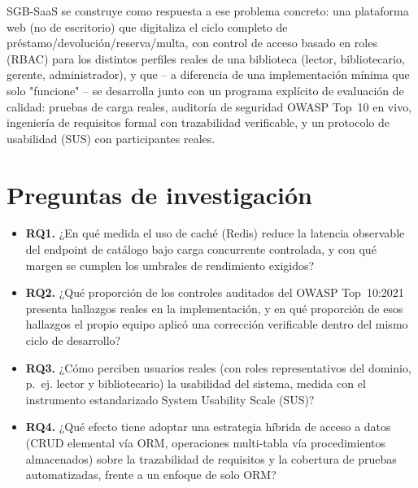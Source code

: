 SGB-SaaS se construye como respuesta a ese problema concreto: una
plataforma web (no de escritorio) que digitaliza el ciclo completo de
préstamo/devolución/reserva/multa, con control de acceso basado en
roles (RBAC) para los distintos perfiles reales de una biblioteca
(lector, bibliotecario, gerente, administrador), y que -- a diferencia
de una implementación mínima que solo "funcione" -- se desarrolla junto
con un programa explícito de evaluación de calidad: pruebas de carga
reales, auditoría de seguridad OWASP Top~10 en vivo, ingeniería de
requisitos formal con trazabilidad verificable, y un protocolo de
usabilidad (SUS) con participantes reales.

\section{Preguntas de investigación}
\label{sec:rqs}


\begin{itemize}[leftmargin=1.2cm]
  \item \textbf{RQ1.} ¿En qué medida el uso de caché (Redis) reduce la
    latencia observable del endpoint de catálogo bajo carga concurrente
    controlada, y con qué margen se cumplen los umbrales de rendimiento
    exigidos?
  \item \textbf{RQ2.} ¿Qué proporción de los controles auditados del
    OWASP Top~10:2021 presenta hallazgos reales en la implementación, y
    en qué proporción de esos hallazgos el propio equipo aplicó una
    corrección verificable dentro del mismo ciclo de desarrollo?
  \item \textbf{RQ3.} ¿Cómo perciben usuarios reales (con roles
    representativos del dominio, p.~ej. lector y bibliotecario) la
    usabilidad del sistema, medida con el instrumento estandarizado
    System Usability Scale (SUS)?
  \item \textbf{RQ4.} ¿Qué efecto tiene adoptar una estrategia híbrida
    de acceso a datos (CRUD elemental vía ORM, operaciones multi-tabla
    vía procedimientos almacenados) sobre la trazabilidad de requisitos
    y la cobertura de pruebas automatizadas, frente a un enfoque de solo
    ORM?
\end{itemize}

